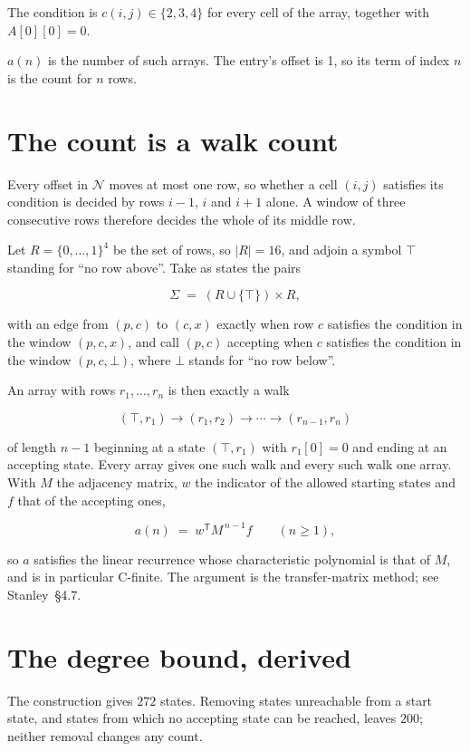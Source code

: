 \documentclass[11pt]{article}
\theoremstyle{definition}
\begin{document}
The condition is $c(i,j) \in \{2, 3, 4\}$ for every cell of the array, together with $A[0][0]=0$.

$a(n)$ is the number of such arrays. The entry's offset is 1, so its term of index $n$ is the count for $n$ rows.

\section{The count is a walk count}

Every offset in $\mathcal{N}$ moves at most one row, so whether a cell $(i,j)$ satisfies its condition is decided by rows $i-1$, $i$ and $i+1$ alone. A window of three consecutive rows therefore decides the whole of its middle row.

Let $R = \{0,\dots,1\}^{4}$ be the set of rows, so $|R| = 16$, and adjoin a symbol $\top$ standing for ``no row above''. Take as states the pairs

\[\Sigma \;=\; (R \cup \{\top\}) \times R,\]

with an edge from $(p,c)$ to $(c,x)$ exactly when row $c$ satisfies the condition in the window $(p,c,x)$, and call $(p,c)$ accepting when $c$ satisfies the condition in the window $(p,c,\bot)$, where $\bot$ stands for ``no row below''.

An array with rows $r_1,\dots,r_n$ is then exactly a walk

\[(\top,r_1) \to (r_1,r_2) \to \cdots \to (r_{n-1},r_n)\]

of length $n-1$ beginning at a state $(\top,r_1)$ with $r_1[0]=0$ and ending at an accepting state. Every array gives one such walk and every such walk one array. With $M$ the adjacency matrix, $w$ the indicator of the allowed starting states and $f$ that of the accepting ones,

\[a(n) \;=\; w^{\mathsf T} M^{\,n-1} f \qquad (n \ge 1),\]

so $a$ satisfies the linear recurrence whose characteristic polynomial is that of $M$, and is in particular C-finite. The argument is the transfer-matrix method; see Stanley~\S4.7.

\section{The degree bound, derived}

The construction gives $272$ states. Removing states unreachable from a start state, and states from which no accepting state can be reached, leaves $200$; neither removal changes any count.
\end{document}
